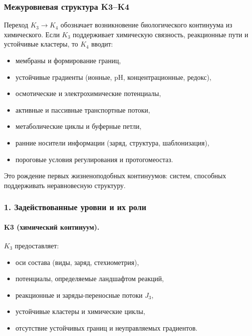 
\subsubsection{Межуровневая структура K3–K4}
\label{sec:crossk-k3-k4}

Переход $K_3 \rightarrow K_4$ обозначает возникновение биологического
континуума из химического. Если $K_3$ поддерживает химическую связность,
реакционные пути и устойчивые кластеры, то $K_4$ вводит:
\begin{itemize}
  \item мембраны и формирование границ,
  \item устойчивые градиенты (ионные, pH, концентрационные, редокс),
  \item осмотические и электрохимические потенциалы,
  \item активные и пассивные транспортные потоки,
  \item метаболические циклы и буферные петли,
  \item ранние носители информации (заряд, структура, шаблонизация),
  \item пороговые условия регулирования и протогомеостаз.
\end{itemize}

Это рождение первых жизненоподобных континуумов: систем, способных поддерживать
неравновесную структуру.

\subsubsection{1. Задействованные уровни и их роли}

\paragraph{K3 (химический континуум).}
$K_3$ предоставляет:
\begin{itemize}
  \item оси состава (виды, заряд, стехиометрия),
  \item потенциалы, определяемые ландшафтом реакций,
  \item реакционные и заряды-переносные потоки $J_3$,
  \item устойчивые кластеры и химические циклы,
  \item отсутствие устойчивых границ и неуправляемых градиентов.
\end{itemize}

